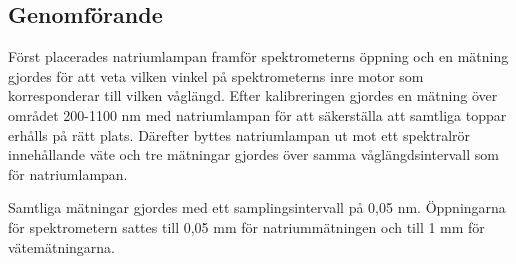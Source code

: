 \documentclass[12pt, a4paper]{article}
\begin{document}
\subsection{Genomförande}
Först placerades natriumlampan framför spektrometerns öppning och en mätning gjordes för att veta vilken vinkel på spektrometerns inre motor som korresponderar 
till vilken våglängd. Efter kalibreringen gjordes en mätning över området 200-1100 nm med natriumlampan för att säkerställa att samtliga toppar
erhålls på rätt plats. Därefter byttes natriumlampan ut mot ett spektralrör innehållande väte och tre mätningar gjordes över samma våglängdsintervall som för natriumlampan.

Samtliga mätningar gjordes med ett samplingsintervall på 0,05 nm. Öppningarna för spektrometern sattes till 0,05 mm för natriummätningen och till 1 mm för vätemätningarna.
\end{document}
